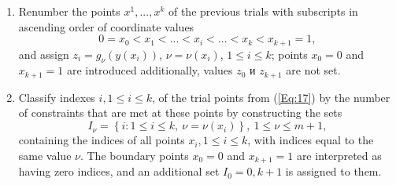 \documentclass[
11pt,%
tightenlines,%
twoside,%
onecolumn,%
nofloats,%
nobibnotes,%
nofootinbib,%
superscriptaddress,%
noshowpacs,%
centertags]%
{revtex4}
\begin{document}
\begin{enumerate}
\item 
Renumber the points $x^1,...,x^k$ of the previous trials with subscripts in ascending order of coordinate values
\begin{equation}\label{Eq:17}
0=x_0<x_1<...<x_i<...<x_k<x_{k+1}=1,
\end{equation}
and assign $z_i=g_\nu(y(x_i))$, $\nu=\nu(x_i)$, $1 \leq i \leq k$; points $x_0=0$ and $x_{k+1}=1$ are introduced additionally, values $z_0$ и $z_{k+1}$ are not set.
\item
Classify indexes  $i,1\leq i \leq k$, of the trial points from  (\ref{Eq:17}) by the number of constraints that are met at these points by constructing the sets
\begin{equation}\label{Eq:18}
I_\nu = \left\{i: 1 \leq i \leq k,\ \nu = \nu(x_i)\right\},\ 1 \leq \nu \leq m+1,
\end{equation}
containing the indices of all points $x_i,1\leq i \leq k$, with indices equal to the same value $\nu$. The boundary points $x_0=0$ and $x_{k+1}=1$ are interpreted as having zero indices, and an additional set $I_0={0,k+1}$ is assigned to them. 


\end{enumerate}
\end{document}
